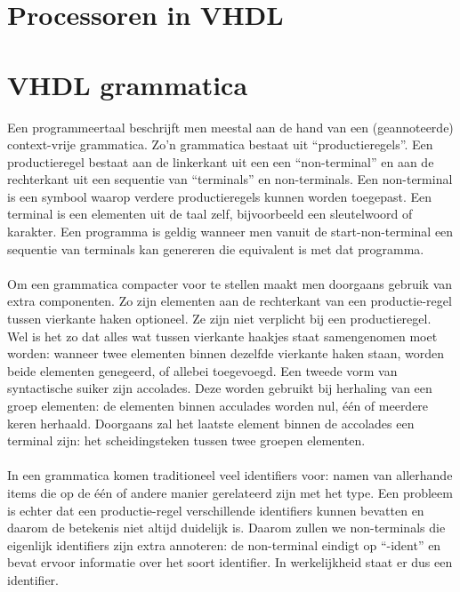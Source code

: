 \section{Processoren in VHDL}

\section{VHDL grammatica}
Een programmeertaal beschrijft men meestal aan de hand van een (geannoteerde) context-vrije grammatica. Zo'n grammatica bestaat uit ``productieregels''. Een productieregel bestaat aan de linkerkant uit een een ``non-terminal'' en aan de rechterkant uit een sequentie van ``terminals'' en non-terminals. Een non-terminal is een symbool waarop verdere productieregels kunnen worden toegepast. Een terminal is een elementen uit de taal zelf, bijvoorbeeld een sleutelwoord of karakter. Een programma is geldig wanneer men vanuit de start-non-terminal een sequentie van terminals kan genereren die equivalent is met dat programma.

\paragraph{}
Om een grammatica compacter voor te stellen maakt men doorgaans gebruik van extra componenten. Zo zijn elementen aan de rechterkant van een productie-regel tussen vierkante haken optioneel. Ze zijn niet verplicht bij een productieregel. Wel is het zo dat alles wat tussen vierkante haakjes staat samengenomen moet worden: wanneer twee elementen binnen dezelfde vierkante haken staan, worden beide elementen genegeerd, of allebei toegevoegd. Een tweede vorm van syntactische suiker zijn accolades. Deze worden gebruikt bij herhaling van een groep elementen: de elementen binnen acculades worden nul, \'e\'en of meerdere keren herhaald. Doorgaans zal het laatste element binnen de accolades een terminal zijn: het scheidingsteken tussen twee groepen elementen.

\paragraph{}
In een grammatica komen traditioneel veel identifiers voor: namen van allerhande items die op de \'e\'en of andere manier gerelateerd zijn met het type. Een probleem is echter dat een productie-regel verschillende identifiers kunnen bevatten en daarom de betekenis niet altijd duidelijk is. Daarom zullen we non-terminals die eigenlijk identifiers zijn extra annoteren: de non-terminal eindigt op ``-ident'' en bevat ervoor informatie over het soort identifier. In werkelijkheid staat er dus een identifier.


